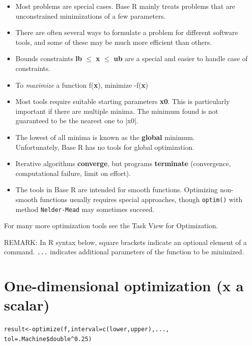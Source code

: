 \documentclass[9pt,a4paper,onecolumn,oneside]{extarticle}
\begin{document}
\begin{landscape}
\begin{multicols}{2}
\begin{itemize}
\item
  Most problems are special cases. Base R mainly treats 
  problems that are unconstrained minimizations of a few parameters.
\item
  There are often several ways to formulate a problem for different software  
  tools, and some of these may be much more efficient than others.
\item
  Bounds constraints \textbf{lb} $\le$ \textbf{x} $\le$
  \textbf{ub} are a special and easier to handle case of constraints.
\item
  To \textit{maximize} a function f(\textbf{x}), minimize -f(\textbf{x}) 
\item
  Most tools require suitable starting parameters \textbf{x0}.
  This is particularly important if there are multiple minima.
  The minimum found is not guaranteed to be the nearest one to |x0|.
\item
  The lowest of all minima is known as the \textbf{global} minimum.\\
  Unfortunately, Base R has no tools for global optimization.
\item
  Iterative algorithms \textbf{converge}, but programs
  \textbf{terminate} (convergence, computational failure, limit on
  effort).
\item
  The tools in Base R are intended for smooth functions. 
  Optimizing non-smooth functions usually requires special approaches, though
  \texttt{optim()} with method \texttt{Nelder-Mead} may sometimes succeed.
\end{itemize}

For many more optimization tools see the Task View for Optimization.

REMARK: In R syntax below, square brackets indicate an optional element of a command.
\texttt{...} indicates additional parameters of the function to be minimized.


\section*{\color{darkred}One-dimensional optimization (x a scalar)}

\begin{alltt}
 result <- optimize(f, interval=c(lower, upper), ...,
                    tol=.Machine\$double\^{}0.25)
\end{alltt}


\end{multicols}
\end{landscape}
\end{document}
